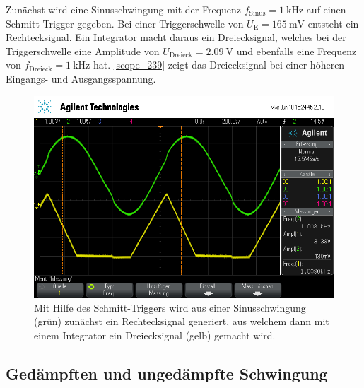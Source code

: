 Zunächst wird eine Sinusschwingung mit der Frequenz $f_\text{Sinus} = \SI{1}{\kilo\hertz}$ auf einen Schmitt-Trigger gegeben. Bei einer Triggerschwelle von $U_\text{E} = \SI{165}{\milli\volt}$ entsteht ein Rechtecksignal. Ein Integrator macht daraus ein Dreiecksignal, welches bei der Triggerschwelle eine Amplitude von $U_\text{Dreieck} = \SI{2.09}{\volt}$ und ebenfalls eine Frequenz von $f_\text{Dreieck} = \SI{1}{\kilo\hertz}$ hat. \autoref{scope_239} zeigt das Dreiecksignal bei einer höheren Eingangs- und Ausgangsspannung.
\begin{figure}[h]
	\centering
	\includegraphics[width=\textwidth]{usb/scope_239.png}
	\caption{Mit Hilfe des Schmitt-Triggers wird aus einer Sinusschwingung (grün) zunächst ein Rechtecksignal generiert, aus welchem dann mit einem Integrator ein Dreiecksignal (gelb) gemacht wird.}
	\label{scope_239}
\end{figure}

\FloatBarrier

\subsection{Ged\"{a}mpften und unged\"{a}mpfte Schwingung}

